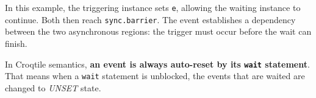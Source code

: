 In this example, the triggering instance sets \texttt{e}, allowing the waiting instance to continue. Both then reach \texttt{sync.barrier}. The event establishes a dependency between the two asynchronous regions: the trigger must occur before the wait can finish.

In Croqtile semantics, \textbf{an event is always auto-reset by its \texttt{wait} statement}. That means when a \texttt{wait} statement is unblocked, the events that are waited are changed to \emph{UNSET} state.

